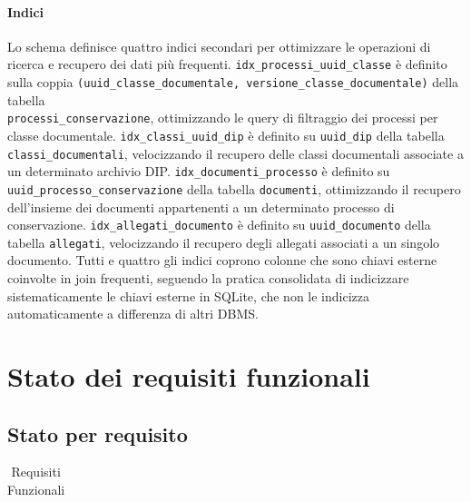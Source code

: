 \documentclass[a4paper,12pt]{article}
\begin{document}
{{{            \paragraph{Indici}
                Lo schema definisce quattro indici secondari per ottimizzare le operazioni 
                di ricerca e recupero dei dati più frequenti.
                \texttt{idx\_processi\_uuid\_classe} è definito sulla coppia 
                \texttt{(uuid\_classe\_documentale, versione\_classe\_documentale)} della 
                tabella\\\texttt{processi\_conservazione}, ottimizzando le query di 
                filtraggio dei processi per classe documentale.
                \texttt{idx\_classi\_uuid\_dip} è definito su \texttt{uuid\_dip} della 
                tabella \texttt{classi\_documentali}, velocizzando il recupero delle classi 
                documentali associate a un determinato archivio DIP.
                \texttt{idx\_documenti\_processo} è definito su 
                \texttt{uuid\_processo\_conservazione} della tabella \texttt{documenti}, 
                ottimizzando il recupero dell'insieme dei documenti appartenenti a un 
                determinato processo di conservazione.
                \texttt{idx\_allegati\_documento} è definito su \texttt{uuid\_documento} 
                della tabella \texttt{allegati}, velocizzando il recupero degli allegati 
                associati a un singolo documento.
                Tutti e quattro gli indici coprono colonne che sono chiavi esterne 
                coinvolte in join frequenti, seguendo la pratica consolidata di indicizzare 
                sistematicamente le chiavi esterne in SQLite, che non le indicizza 
                automaticamente a differenza di altri DBMS.
        }
    }

    \section{Stato dei requisiti funzionali} {
        \subsection{Stato per requisito} {
            \begin{longtable}{|>{\centering\arraybackslash}m{}|>{\centering\arraybackslash}m{}|>{\centering\arraybackslash}m{}|}
                \caption{Requisiti Funzionali} \\
                

\end{longtable}}}}
\end{document}
